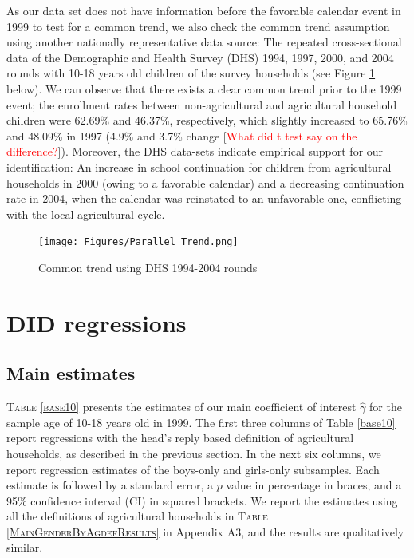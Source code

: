 \documentclass[12pt,letterpaper]{article}\usepackage[margin=1in]{geometry}
\newcommand{\SAdded}[1]{\textcolor{red}{#1}}
\newcommand{\0}{\ensuremath{\mbox{\boldmath $0$}}}
\begin{document}
As our data set does not have information before the favorable calendar event in 1999 to test for a common trend, we also check the common trend assumption using another nationally representative data source: The repeated cross-sectional data of the Demographic and Health Survey (DHS) 1994, 1997, 2000, and 2004 rounds with 10-18 years old children of the survey households (see Figure \ref{ptrendDHS} below). We can observe that there exists a clear common trend prior to the 1999 event; the enrollment rates between non-agricultural and agricultural household children were 62.69\% and 46.37\%, respectively, which slightly increased to 65.76\% and 48.09\% in 1997 (4.9\% and 3.7\% change [\SAdded{What did t test say on the difference?}]). Moreover, the DHS data-sets indicate empirical support for our identification: An increase in school continuation for children from agricultural households in 2000 (owing to a favorable calendar) and a decreasing continuation rate in 2004, when the calendar was reinstated to an unfavorable one, conflicting with the local agricultural cycle. 


\begin{figure}[h!]
\centering
\texttt{[image: Figures/Parallel Trend.png]}\\
\caption{Common trend using DHS 1994-2004 rounds}
\label{ptrendDHS}
\end{figure}




\section{DID regressions}\label{sec_DID}
\subsection{Main estimates}

\textsc{\small Table \ref{base10}} presents the estimates of our main coefficient of interest $\hat{\gamma}$ for the sample age of 10-18 years old in 1999. The first three columns of Table \ref{base10} report regressions with the head's reply based definition of agricultural households, as described in the previous section. In the next six columns, we report regression estimates of the boys-only and girls-only subsamples. Each estimate is followed by a standard error, a $p$ value in percentage in braces, and a 95\% confidence interval (CI) in squared brackets. We report the estimates using all the definitions of agricultural households in \textsc{Table \ref{MainGenderByAgdefResults}} in Appendix A3, and the results are qualitatively similar. 
\end{document}
